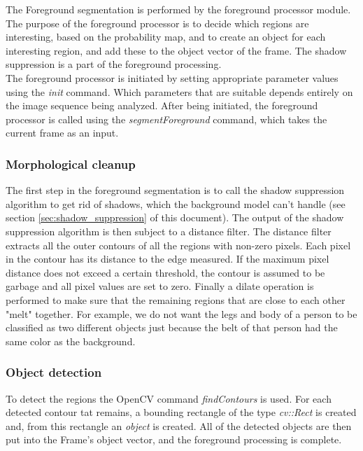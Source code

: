 The Foreground segmentation is performed by the foreground processor module. The purpose of the foreground processor is to decide which regions are interesting, based on the probability map, and to create an object for each interesting region, and add these to the object vector of the frame. The shadow suppression is a part of the foreground processing. \\
\newline
The foreground processor is initiated by setting appropriate parameter values using the \emph{init} command. Which parameters that are suitable depends entirely on the image sequence being analyzed. After being initiated, the foreground processor is called using the \emph{segmentForeground} command, which takes the current frame as an input.

\subsubsection{Morphological cleanup}
The first step in the foreground segmentation is to call the shadow suppression algorithm to get rid of shadows, which the background model can't handle (see section \ref{sec:shadow_suppression} of this document). The output of the shadow suppression algorithm is then subject to a distance filter. The distance filter extracts all the outer contours of all the regions with non-zero pixels. Each pixel in the contour has its distance to the edge measured. If the maximum pixel distance does not exceed a certain threshold, the contour is assumed to be garbage and all pixel values are set to zero. Finally a dilate operation is performed to make sure that the remaining regions that are close to each other "melt" together. For example, we do not want the legs and body of a person to be classified as two different objects just because the belt of that person had the same color as the background. 


\subsubsection{Object detection}
To detect the regions the OpenCV command \emph{findContours} is used. For each detected contour tat remains, a bounding rectangle of the type \emph{cv::Rect} is created and, from this rectangle an \emph{object} is created. All of the detected objects are then put into the Frame's object vector, and the foreground processing is complete.


